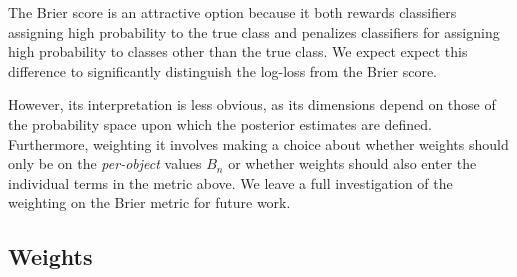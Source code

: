 The Brier score is an attractive option because it both rewards classifiers assigning high probability to the true class and penalizes classifiers for assigning high probability to classes other than the true class.
We expect expect this difference to significantly distinguish the log-loss from the Brier score.

However, its interpretation is less obvious, as its dimensions depend on those of the probability space upon which the posterior estimates are defined. Furthermore, weighting it involves making a choice about whether weights should only be on the \textit{per-object} values $B_{n}$ or whether weights should also enter the individual terms in the metric above. We leave a full investigation of the weighting on the Brier metric for future work.



%

\subsection{Weights}
\label{sec:weights}

